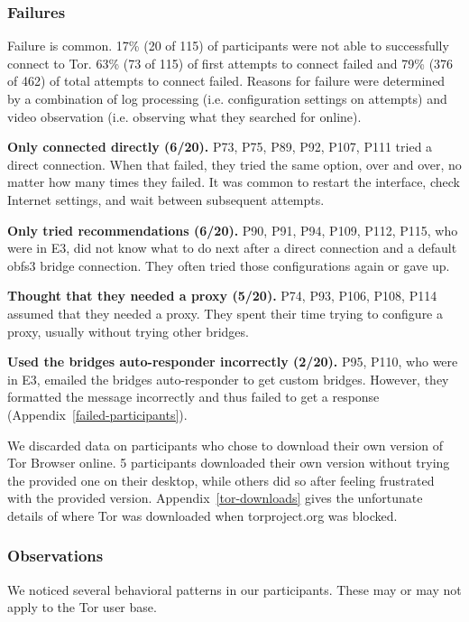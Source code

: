 \documentclass[USenglish,oneside,twocolumn]{article}
\begin{document}
\subsubsection{Failures}
Failure is common. 17\% (20 of 115) of participants were not able to successfully connect to Tor. 63\% (73 of 115) of first attempts to connect failed and {\color {red} 79\% (376 of 462)} of total attempts to connect failed. Reasons for failure were determined by a combination of log processing (i.e. configuration settings on attempts) and video observation (i.e. observing what they searched for online). \\ 

\begin{description}
\item {\bfseries Only connected directly (6/20).} P73, P75, P89, P92, P107, P111 tried a direct connection. When that failed, they tried the same option, over and over, no matter how many times they failed. It was common to restart the interface, check Internet settings, and wait between subsequent attempts.

\item {\bfseries Only tried recommendations (6/20).} P90, P91, P94, P109, P112, P115, who were in E3, did not know what to do next after a direct connection and a default obfs3 bridge connection. They often tried those configurations again or gave up. 

\item {\bfseries Thought that they needed a proxy (5/20).} P74, P93, P106, P108, P114 assumed that they needed a proxy. They spent their time trying to configure a proxy, usually without trying other bridges. 

\item {\bfseries Used the bridges auto-responder incorrectly (2/20).} P95, P110, who were in E3, emailed the bridges auto-responder to get custom bridges. However, they formatted the message incorrectly and thus failed to get a response (Appendix~\ref{failed-participants}).
\end{description}

We discarded data on participants who chose to download their own version of Tor Browser online. 5 participants downloaded their own version without trying the provided one on their desktop, while others did so after feeling frustrated with the provided version. Appendix~\ref{tor-downloads} gives the unfortunate details of where Tor was downloaded when torproject.org was blocked.


\subsubsection{Observations}
We noticed several behavioral patterns in our participants. These may or may not apply to the Tor user base.\\
\end{document}
